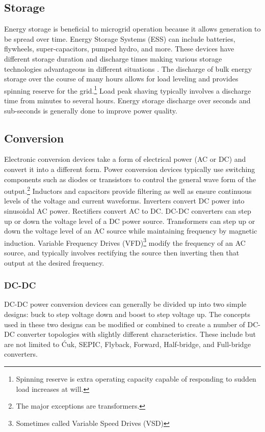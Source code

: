 \subsection{Storage}
Energy storage is beneficial to microgrid operation because it allows generation to be spread over time. Energy Storage Systems (ESS) can include batteries, flywheels, super-capacitors, pumped hydro, and more. These devices have different storage duration and discharge times making various storage technologies advantageous in different situations \cite{Schoenung2003}. The discharge of bulk energy storage over the course of many hours allows for load leveling and provides spinning reserve for the grid.\footnote{Spinning reserve is extra operating capacity capable of responding to sudden load increases at will.} Load peak shaving typically involves a discharge time from minutes to several hours. Energy storage discharge over seconds and sub-seconds is generally done to improve power quality.


\subsection{Conversion}
Electronic conversion devices take a form of electrical power (AC or DC) and convert it into a different form. Power conversion devices typically use switching components such as diodes or transistors to control the general wave form of the output.\footnote{The major exceptions are transformers.} Inductors and capacitors provide filtering as well as ensure continuous levels of the voltage and current waveforms. Inverters convert DC power into sinusoidal AC power. Rectifiers convert AC to DC. DC-DC converters can step up or down the voltage level of a DC power source. Transformers can step up or down the voltage level of an AC source while maintaining frequency by magnetic induction. Variable Frequency Drives (VFD)\footnote{Sometimes called Variable Speed Drives (VSD)} modify the frequency of an AC source, and typically involves rectifying the source then inverting then that output at the desired frequency. 

\subsubsection{DC-DC}
DC-DC power conversion devices can generally be divided up into two simple designs: buck to step voltage down and boost to step voltage up. The concepts used in these two designs can be modified or combined to create a number of  DC-DC converter topologies with slightly different characteristics. These include but are not limited to \'Cuk, SEPIC, Flyback, Forward, Half-bridge, and Full-bridge converters.

